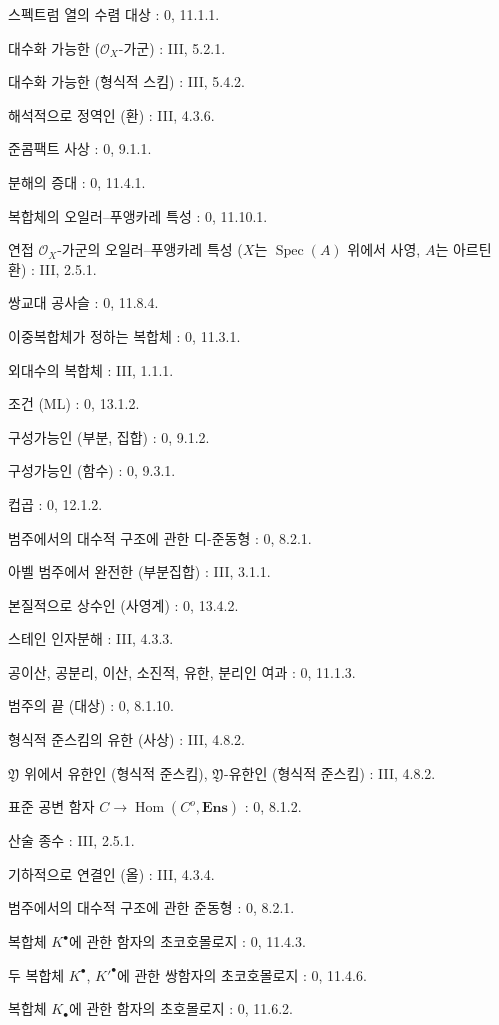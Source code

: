 \begin{flushleft}
스펙트럼 열의 수렴 대상 : 0, 11.1.1.

대수화 가능한 ($\mathcal O_X$-가군) : III, 5.2.1.

대수화 가능한 (형식적 스킴) : III, 5.4.2.

해석적으로 정역인 (환) : III, 4.3.6.

준콤팩트 사상 : 0, 9.1.1.

분해의 증대 : 0, 11.4.1.

복합체의 오일러--푸앵카레 특성 : 0, 11.10.1.

연접 $\mathcal O_X$-가군의 오일러--푸앵카레 특성
($X$는 $\operatorname{Spec}(A)$ 위에서 사영, $A$는 아르틴 환) :
III, 2.5.1.

쌍교대 공사슬 : 0, 11.8.4.

이중복합체가 정하는 복합체 : 0, 11.3.1.

외대수의 복합체 : III, 1.1.1.

조건 (ML) : 0, 13.1.2.

구성가능인 (부분, 집합) : 0, 9.1.2.

구성가능인 (함수) : 0, 9.3.1.

컵곱 : 0, 12.1.2.

범주에서의 대수적 구조에 관한 디-준동형 : 0, 8.2.1.

아벨 범주에서 완전한 (부분집합) : III, 3.1.1.

본질적으로 상수인 (사영계) : 0, 13.4.2.

스테인 인자분해 : III, 4.3.3.

공이산, 공분리, 이산, 소진적, 유한, 분리인 여과 : 0, 11.1.3.

범주의 끝 (대상) : 0, 8.1.10.

형식적 준스킴의 유한 (사상) : III, 4.8.2.

$\mathfrak Y$ 위에서 유한인 (형식적 준스킴),
$\mathfrak Y$-유한인 (형식적 준스킴) : III, 4.8.2.

표준 공변 함자 $C\to\operatorname{Hom}(C^o,\mathbf{Ens})$ : 0, 8.1.2.

산술 종수 : III, 2.5.1.

기하적으로 연결인 (올) : III, 4.3.4.

범주에서의 대수적 구조에 관한 준동형 : 0, 8.2.1.

복합체 $K^\bullet$에 관한 함자의 초코호몰로지 : 0, 11.4.3.

두 복합체 $K^\bullet$, $K'^{\bullet}$에 관한 쌍함자의
초코호몰로지 : 0, 11.4.6.

복합체 $K_\bullet$에 관한 함자의 초호몰로지 : 0, 11.6.2.


\end{flushleft}
